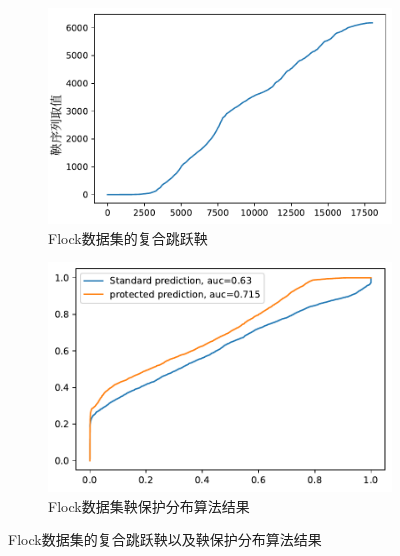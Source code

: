 
\begin{figure}
     \centering
     \begin{subfigure}[b]{.45\textwidth}
         \centering
         \includegraphics[width=1\textwidth]{Img/chapter11/flock-martingale-MLPClassifier}   
         \caption{Flock数据集的复合跳跃鞅}
         \label{mlp-jump-flock}
     \end{subfigure}
     \hfill
     \begin{subfigure}[b]{.45\textwidth}
         \centering
         \includegraphics[width=1\textwidth]{Img/chapter11/flock-MLPClassifier}
         \caption{Flock数据集鞅保护分布算法结果}
         \label{mlp-jump-martingale-flock}
     \end{subfigure}
\caption{Flock数据集的复合跳跃鞅以及鞅保护分布算法结果}
\label{fig:flock}
\end{figure}


